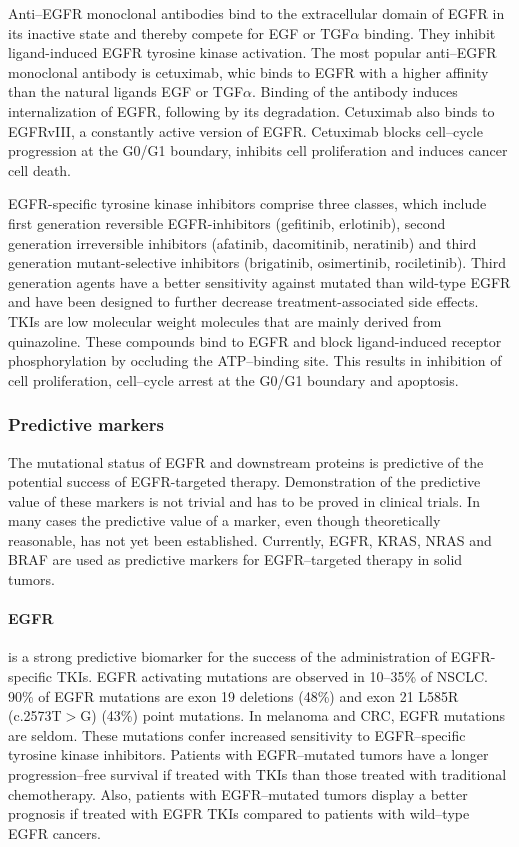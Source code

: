 {{       Anti--EGFR monoclonal antibodies bind to the extracellular domain of
      EGFR in its inactive state and thereby compete for EGF or TGF$\alpha$
      binding. They inhibit ligand-induced EGFR tyrosine kinase activation. The
      most popular anti--EGFR monoclonal antibody is cetuximab, whic binds to
      EGFR with a higher affinity than the natural ligands EGF or TGF$\alpha$.
      Binding of the antibody induces internalization of EGFR, following by its
      degradation. Cetuximab also binds to EGFRvIII, a constantly active
      version of EGFR. Cetuximab blocks cell--cycle  progression at the G0/G1
      boundary, inhibits cell proliferation and induces cancer cell death.

      EGFR-specific tyrosine kinase inhibitors comprise three classes, which
      include first generation reversible  EGFR-inhibitors (gefitinib,
      erlotinib), second generation irreversible inhibitors (afatinib,
      dacomitinib, neratinib) and third generation mutant-selective inhibitors
      (brigatinib, osimertinib, rociletinib). Third generation agents have a
      better sensitivity against mutated than wild-type EGFR and have been
      designed to further decrease treatment-associated side effects. TKIs are
      low molecular weight molecules that are mainly derived from quinazoline.
      These compounds bind to EGFR and block ligand-induced receptor
      phosphorylation by occluding the ATP--binding site. This results in
      inhibition of cell proliferation, cell--cycle arrest at the G0/G1 boundary
      and apoptosis.

    \subsubsection{Predictive markers}

      The mutational status of EGFR and downstream proteins is predictive of the
      potential success of EGFR-targeted therapy. Demonstration of the
      predictive value of these markers is not trivial and has to be proved in
      clinical trials. In many cases the predictive value of a marker, even
      though theoretically reasonable, has not yet been established. Currently,
      EGFR, KRAS, NRAS and BRAF are  used as predictive markers for
      EGFR--targeted therapy in solid tumors.

      \paragraph{EGFR} is a strong predictive biomarker for the success of the
      administration of EGFR-specific TKIs. EGFR activating mutations are
      observed in 10--35\% of NSCLC. 90\% of EGFR mutations are exon 19
      deletions (48\%) and exon 21 L585R (c.2573T$>$G) (43\%) point mutations.
      In melanoma and CRC, EGFR mutations are seldom. These mutations confer
      increased sensitivity to EGFR--specific tyrosine kinase inhibitors.
      Patients with EGFR--mutated tumors have a longer progression--free
      survival if treated with TKIs than those treated with traditional
      chemotherapy. Also, patients with EGFR--mutated tumors display a better
      prognosis if treated with EGFR TKIs compared to patients with wild--type
      EGFR cancers.

}}
